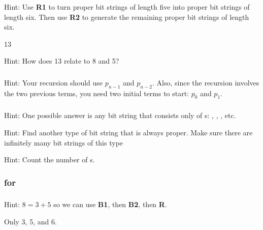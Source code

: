 \subsubsection*{ \answers}
\begin{apart}
    \item Hint: Use \textbf{R1} to turn proper bit strings of length five into proper bit strings of length six.  Then use \textbf{R2} to generate the remaining proper bit strings of length six.
    \item 13
    \item Hint: How does 13 relate to 8 and 5?
\end{apart}

\subsubsection*{ \answers}
Hint: Your recursion should use $p_{n-1}$ and $p_{n-2}$. Also, since the recursion involves the two previous terms, you need two initial terms to start: $p_0$ and $p_1$.

\subsubsection*{ \answers}
\begin{apart}
    \item Hint: One possible answer is any bit string that consists only of s:  , , , etc.
    \item Hint: Find another type of bit string that is always proper.  Make sure there are infinitely many bit strings of this type
    \item Hint: Count the number of s.
    \end{apart}

\subsubsection{\answers for 
\subrecsets}

\subsubsection*{ \answers}
\begin{apart}
    \item Hint: $8 = 3+5$ so we can use \textbf{B1}, then \textbf{B2}, then \textbf{R}.
    \item Only 3, 5, and 6.
\end{apart}

